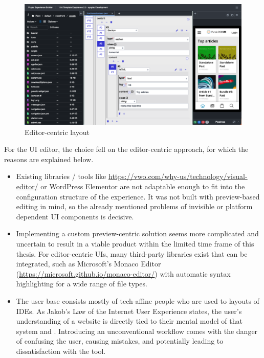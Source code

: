 \begin{figure}[h!]
  \includegraphics[width=\textwidth]{pics/editor-centric-screenshot.png}
  \caption{Editor-centric layout}
  \label{fig:editor-centric}
\end{figure}
\bigskip

For the UI editor, the choice fell on the editor-centric approach, for which the reasons are explained below.
\begin{itemize}
  \item Existing libraries / tools like \url{https://vwo.com/why-us/technology/visual-editor/} or WordPress Elementor are not adaptable enough to fit into the configuration structure of the  \Gls{experience}. It was not built with preview-based editing in mind, so the already mentioned problems of invisible or platform dependent UI components is decisive.
  \item Implementing a custom preview-centric solution seems more complicated and uncertain to result in a viable product within the limited time frame of this thesis. For editor-centric UIs, many third-party libraries exist that can be integrated, such as Microsoft's Monaco Editor (\url{https://microsoft.github.io/monaco-editor/}) with automatic syntax highlighting for a wide range of file types.
  \item The user base consists mostly of tech-affine people who are used to layouts of IDEs. As Jakob's Law of the Internet User Experience states, the user's understanding of a website is directly tied to their mental model of that system \cite{Nielsen:2000} and \cite[p. 2]{LawsOfUX:2020ys}. Introducing an unconventional workflow comes with the danger of confusing the user, causing mistakes, and potentially leading to dissatisfaction with the tool.
\end{itemize}

